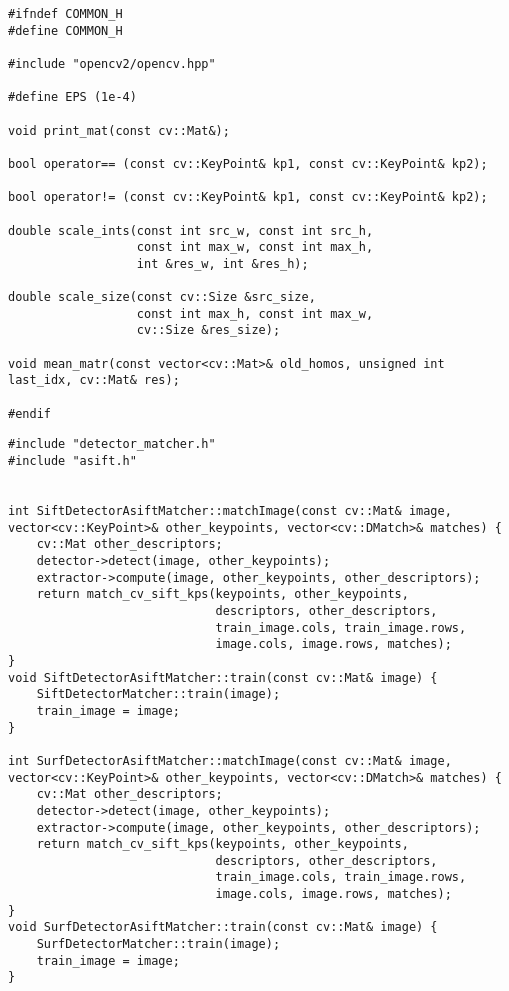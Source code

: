 \begin{lstlisting}
#ifndef COMMON_H
#define COMMON_H

#include "opencv2/opencv.hpp"

#define EPS (1e-4)

void print_mat(const cv::Mat&);

bool operator== (const cv::KeyPoint& kp1, const cv::KeyPoint& kp2);

bool operator!= (const cv::KeyPoint& kp1, const cv::KeyPoint& kp2);

double scale_ints(const int src_w, const int src_h, 
                  const int max_w, const int max_h, 
                  int &res_w, int &res_h);

double scale_size(const cv::Size &src_size, 
                  const int max_h, const int max_w,
                  cv::Size &res_size);

void mean_matr(const vector<cv::Mat>& old_homos, unsigned int last_idx, cv::Mat& res);

#endif
\end{lstlisting}
\begin{lstlisting}
#include "detector_matcher.h"
#include "asift.h"


int SiftDetectorAsiftMatcher::matchImage(const cv::Mat& image, vector<cv::KeyPoint>& other_keypoints, vector<cv::DMatch>& matches) {
    cv::Mat other_descriptors;
    detector->detect(image, other_keypoints);
    extractor->compute(image, other_keypoints, other_descriptors);
    return match_cv_sift_kps(keypoints, other_keypoints,
                             descriptors, other_descriptors,
                             train_image.cols, train_image.rows,
                             image.cols, image.rows, matches);
}
void SiftDetectorAsiftMatcher::train(const cv::Mat& image) {
    SiftDetectorMatcher::train(image);
    train_image = image;
}

int SurfDetectorAsiftMatcher::matchImage(const cv::Mat& image, vector<cv::KeyPoint>& other_keypoints, vector<cv::DMatch>& matches) {
    cv::Mat other_descriptors;
    detector->detect(image, other_keypoints);
    extractor->compute(image, other_keypoints, other_descriptors);
    return match_cv_sift_kps(keypoints, other_keypoints,
                             descriptors, other_descriptors,
                             train_image.cols, train_image.rows,
                             image.cols, image.rows, matches);
}
void SurfDetectorAsiftMatcher::train(const cv::Mat& image) {
    SurfDetectorMatcher::train(image);
    train_image = image;
}

\end{lstlisting}
